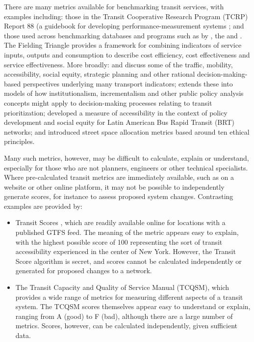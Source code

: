 \documentclass[preprint, 3p,
authoryear]{elsarticle} %
\begin{document}
There are many metrics available for benchmarking transit services, with
examples including: those in the Transit Cooperative Research Program
(TCRP) Report 88 (a guidebook for developing performance-measurement
systems \citep{Ryus:2003aa}; and those used across benchmarking
databases and programs such as by
\citet{Florida-Transit-Information-System:2018aa}, the
\citet{UITP:2015aa} and \citet{Imperial-College-London:2023aa}. The
Fielding Triangle \citep{FieldingGordonJ1987Mpts} provides a framework
for combining indicators of service inputs, outputs and consumption to
describe cost efficiency, cost effectiveness and service effectiveness.
More broadly: \citet{Litman:2003ab} and \citet{Litman:2016aa} discuss
some of the traffic, mobility, accessibility, social equity, strategic
planning and other rational decision-making-based perspectives
underlying many transport indicators; \citet{Reynolds:2017ah} extends
these into models of how institutionalism, incrementalism and other
public policy analysis concepts might apply to decision-making processes
relating to transit prioritization; \citet{GuzmanLuisA.2017Aeit}
developed a measure of accessibility in the context of policy
development and social equity for Latin American Bus Rapid Transit (BRT)
networks; and \citet{Creutzig2020streetspaceallocation} introduced
street space allocation metrics based around ten ethical principles.

Many such metrics, however, may be difficult to calculate, explain or
understand, especially for those who are not planners, engineers or
other technical specialists. Where pre-calculated transit metrics are
immediately available, such as on a website or other online platform, it
may not be possible to independently generate scores, for instance to
assess proposed system changes. Contrasting examples are provided by:

\begin{itemize}
\item
  Transit Scores \citep{WalkScore:2023tg}, which are readily available
  online for locations with a published GTFS feed. The meaning of the
  metric appears easy to explain, with the highest possible score of 100
  representing the sort of transit accessibility experienced in the
  center of New York. However, the Transit Score algorithm is secret,
  and scores cannot be calculated independently or generated for
  proposed changes to a network.
\item
  The Transit Capacity and Quality of Service Manual (TCQSM), which
  provides a wide range of metrics for measuring different aspects of a
  transit system. The TCQSM scores themselves appear easy to understand
  or explain, ranging from A (good) to F (bad), although there are a
  large number of metrics. Scores, however, can be calculated
  independently, given sufficient data.
\end{itemize}
\end{document}
